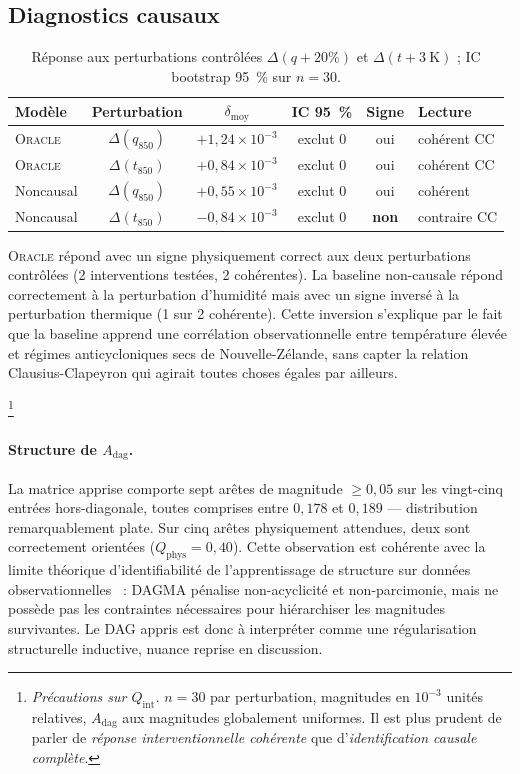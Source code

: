 \documentclass[14pt,a4paper,openany]{extreport}
\theoremstyle{definition}
\newcommand{\Oracle}{\textsc{Oracle}}
\newcommand{\Adag}{\ensuremath{A_{\mathrm{dag}}}}
\begin{document}
\subsection{Diagnostics causaux}
\label{ssec:exp-res-causal}

\begin{table}[ht]
  \centering
  \small
  \caption{Réponse aux perturbations contrôlées $\Delta(q +20\%)$ et $\Delta(t +3~\mathrm{K})$ ; IC bootstrap 95~\% sur $n = 30$.}
  \label{tab:exp-res-int}
  \begin{tabularx}{\linewidth}{l c c c c X}
    \toprule
    \textbf{Modèle} & \textbf{Perturbation} & $\delta_{\mathrm{moy}}$ & \textbf{IC 95~\%} & \textbf{Signe} & \textbf{Lecture} \\
    \midrule
    \Oracle{} & $\Delta(q_{850})$ & $+1{,}24 \times 10^{-3}$ & exclut 0 & oui & cohérent CC \\
    \Oracle{} & $\Delta(t_{850})$ & $+0{,}84 \times 10^{-3}$ & exclut 0 & oui & cohérent CC \\
    Noncausal & $\Delta(q_{850})$ & $+0{,}55 \times 10^{-3}$ & exclut 0 & oui & cohérent \\
    Noncausal & $\Delta(t_{850})$ & $-0{,}84 \times 10^{-3}$ & exclut 0 & \textbf{non} & contraire CC \\
    \bottomrule
  \end{tabularx}
\end{table}

\Oracle{} répond avec un signe physiquement correct aux deux perturbations contrôlées (2 interventions testées, 2 cohérentes). La baseline non-causale répond correctement à la perturbation d'humidité mais avec un signe inversé à la perturbation thermique (1 sur 2 cohérente). Cette inversion s'explique par le fait que la baseline apprend une corrélation observationnelle entre température élevée et régimes anticycloniques secs de Nouvelle-Zélande, sans capter la relation Clausius-Clapeyron qui agirait toutes choses égales par ailleurs.

\footnote{\emph{Précautions sur $Q_{\mathrm{int}}$.} $n=30$ par perturbation, magnitudes en $10^{-3}$ unités relatives, $\Adag$ aux magnitudes globalement uniformes. Il est plus prudent de parler de \emph{réponse interventionnelle cohérente} que d'\emph{identification causale complète}.}

\paragraph{Structure de $\Adag$.} La matrice apprise comporte sept arêtes de magnitude $\geq 0{,}05$ sur les vingt-cinq entrées hors-diagonale, toutes comprises entre $0{,}178$ et $0{,}189$ --- distribution remarquablement plate. Sur cinq arêtes physiquement attendues, deux sont correctement orientées ($Q_{\mathrm{phys}} = 0{,}40$). Cette observation est cohérente avec la limite théorique d'identifiabilité de l'apprentissage de structure sur données observationnelles~\cite{pearl_causality_2009} : DAGMA pénalise non-acyclicité et non-parcimonie, mais ne possède pas les contraintes nécessaires pour hiérarchiser les magnitudes survivantes. Le DAG appris est donc à interpréter comme une régularisation structurelle inductive, nuance reprise en discussion.
\end{document}
